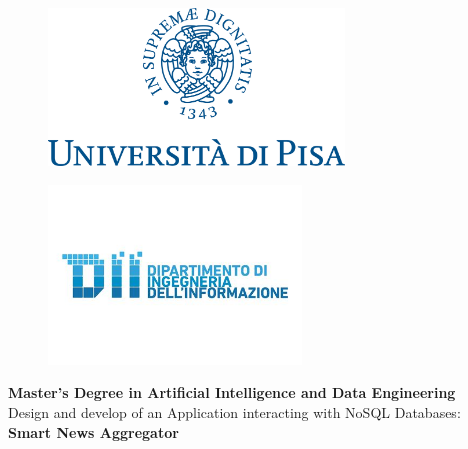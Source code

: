 
\begin{titlepage} %
\begin{figure}[t] %
    \centering\includegraphics[width=0.70\textwidth]{marchio_unipi_pant541}\label{fig:figure-first-page}
\end{figure}

\begin{figure}[t] %
    \centering\includegraphics[width=0.60\textwidth]{DII Logo}\label{fig:figure-first-page-2}
\end{figure}

\vspace{5mm}

\begin{Large}
 \begin{center}
	\textbf{Master's Degree in Artificial Intelligence and Data Engineering\\}
	\vspace{7mm}
    {\Large{Design and develop of an Application interacting with NoSQL Databases:}}\\
	\vspace{2mm}
	{\LARGE{\textbf{Smart News Aggregator}}}
\end{center}
\end{Large}

\vspace{10mm}


\end{titlepage}
